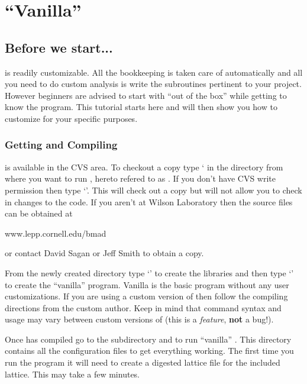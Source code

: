 

\chapter{``Vanilla'' \tao}
\label{c:vanilla_tao}

\section{Before we start...}
\label{s:before_beginning}

\tao is readily customizable. All the bookkeeping is taken care of automatically
and all you need to do custom analysis is write the subroutines pertinent to
your project. However beginners are advised to start with ``out of the box''
\tao while getting to know the program. This tutorial starts here and will then
show you how to customize \tao for your specific purposes.

\subsection{Getting and Compiling \tao}
\label{s:get_and_compile}

\tao is available in the \cesr CVS area. To checkout a copy type ` in the directory from where you want to run \tao, hereto refered to as
. If you don't have \cesr CVS write permission then type `'. This will check out a copy but will not allow you to check in changes
to the code. If you aren't at Wilson Laboratory then the source files can be
obtained at
\begin{example}
www.lepp.cornell.edu/bmad
\end{example}
or contact David Sagan  or Jeff Smith 
 to obtain a copy. 

From the newly created  directory type `' to create the
libraries and then type `' to create
the ``vanilla'' \tao program. Vanilla \tao is the basic \tao program without any
user customizations. If you are using a custom version of \tao then
follow the compiling directions from the custom \tao author. Keep in mind that
command syntax and usage may vary between custom versions of \tao (this is a
\textit{feature}, \textbf{not} a bug!).

Once \tao has compiled go to the subdirectory  and
 to run ``vanilla'' \tao. This directory contains all the
configuration files to get everything working. The first time you run the
program it will need to create a digested \bmad lattice file for the included
lattice. This may take a few minutes.

